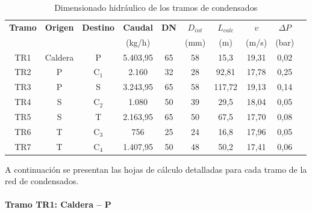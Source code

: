 \begin{table}[H]
	\centering
	\caption{Dimensionado hidráulico de los tramos de condensados}
	\label{tab:dimensionado-condensados}
	\begin{tabular}{cccccccccc}
		\toprule
		\textbf{Tramo} & \textbf{Origen} & \textbf{Destino} & \textbf{Caudal} & \textbf{DN} & \textbf{$D_{int}$} & \textbf{$L_{calc}$} & \textbf{$v$} & \textbf{$\Delta P$} \\
		               &                 &                  & (kg/h)          &             & (mm)               & (m)                 & (m/s)        & (bar)               \\
		\midrule
		TR1            & Caldera         & P                & 5.403{,}95      & 65          & 58                 & 15{,}3              & 19{,}31      & 0{,}02              \\
		TR2            & P               & C$_1$            & 2.160           & 32          & 28                 & 92{,}81             & 17{,}78      & 0{,}25              \\
		TR3            & P               & S                & 3.243{,}95      & 65          & 58                 & 117{,}72            & 19{,}13      & 0{,}14              \\
		TR4            & S               & C$_2$            & 1.080           & 50          & 39                 & 29{,}5              & 18{,}04      & 0{,}05              \\
		TR5            & S               & T                & 2.163{,}95      & 65          & 50                 & 67{,}5              & 17{,}70      & 0{,}08              \\
		TR6            & T               & C$_3$            & 756             & 25          & 24                 & 16{,}8              & 17{,}96      & 0{,}05              \\
		TR7            & T               & C$_4$            & 1.407{,}95      & 50          & 48                 & 50{,}2              & 17{,}41      & 0{,}06              \\
		\bottomrule
	\end{tabular}
\end{table}

A continuación se presentan las hojas de cálculo detalladas para cada tramo de la red de condensados.

\paragraph{Tramo TR1: Caldera -- P}

